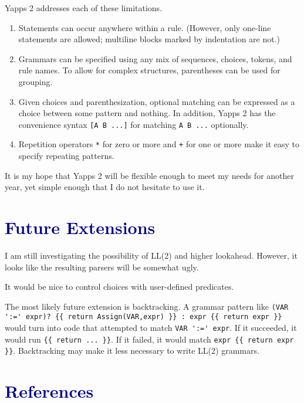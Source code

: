 \documentclass[10pt]{article}
\newcommand{\mysection}[1]{\section{\textcolor{darkblue}{#1}}}
\begin{document}
Yapps 2 addresses each of these limitations.

\begin{enumerate}
 \item Statements can occur anywhere within a rule.  (However, only
   one-line statements are allowed; multiline blocks marked by
   indentation are not.)
 \item Grammars can be specified using any mix of sequences, choices,
   tokens, and rule names.  To allow for complex structures,
   parentheses can be used for grouping.
 \item Given choices and parenthesization, optional matching can be
   expressed as a choice between some pattern and nothing.  In
   addition, Yapps 2 has the convenience syntax \verb|[A B ...]| for
   matching \verb|A B ...| optionally.
 \item Repetition operators \verb|*| for zero or more and \verb|+| for 
   one or more make it easy to specify repeating patterns.
\end{enumerate}

It is my hope that Yapps 2 will be flexible enough to meet my needs
for another year, yet simple enough that I do not hesitate to use it.

\mysection{Future Extensions}
\label{sec:future}

I am still investigating the possibility of LL(2) and higher
lookahead.  However, it looks like the resulting parsers will be
somewhat ugly.  

It would be nice to control choices with user-defined predicates.

The most likely future extension is backtracking.  A grammar pattern
like \verb|(VAR ':=' expr)? {{ return Assign(VAR,expr) }} : expr {{ return expr }}|
would turn into code that attempted to match \verb|VAR ':=' expr|.  If 
it succeeded, it would run \verb|{{ return ... }}|.  If it failed, it
would match \verb|expr {{ return expr }}|.  Backtracking may make it
less necessary to write LL(2) grammars.

\mysection{References}
\end{document}
